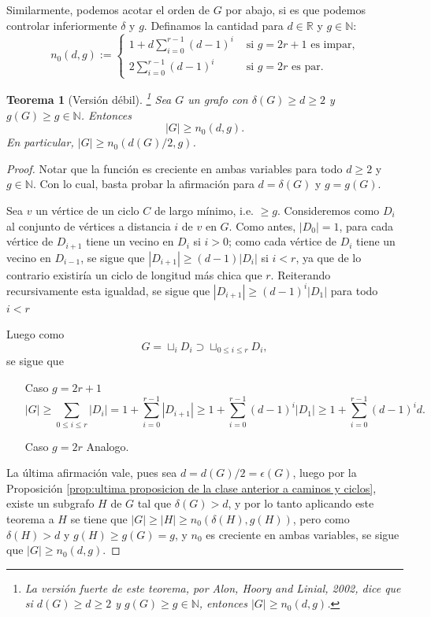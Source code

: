 \documentclass[12pt]{report}
\theoremstyle{plain}
\newtheorem{theorem}{Teorema}[section]
\theoremstyle{definition}
\newcommand{\naturals}{\mathbb{N}}
\newcommand{\reals}{\mathbb{R}}
\newcommand{\abs}[1]{\left \vert #1 \right \vert}
\begin{document}
Similarmente, podemos acotar el orden de $G$ por abajo, si es que podemos controlar inferiormente $\delta$ y $g$. Definamos la cantidad para $d \in \reals$ y $g \in \naturals$:
\[
n_0(d,g):= \begin{cases}
            1 + d \sum_{i = 0}^{r-1} (d-1)^i & \text{ si $g = 2 r +1$ es impar,}\\
            2 \sum_{i=0}^{r-1} (d-1)^i & \text{ si $g = 2 r$ es par.}
            \end{cases}
\]

\begin{theorem}[Versión débil]\label{th:version debil del teorema de Alon, Hoory y Lineal en 2002}\footnote{La versión fuerte de este teorema, por Alon, Hoory and Linial, 2002, dice que
si $d(G) \geq d \geq 2$ y $g(G) \geq g \in \naturals$, entonces $\abs G \geq n_0 (d,g)$.}
Sea $G$ un grafo con $\delta (G) \geq d \geq 2$ y $g(G) \geq g \in \naturals$. Entonces
\[
\abs G \geq n_0 (d,g).
\]
En particular, $\abs G \geq n_0 ( d(G)/2, g)$.
\end{theorem}
\begin{proof}
Notar que la función es creciente en ambas variables para todo $d \geq 2$ y $g \in \naturals$. Con lo cual, basta
probar la afirmación para $d = \delta(G)$ y $g = g(G)$.

Sea $v$ un vértice de un ciclo $C$ de largo mínimo, i.e. $\geq g$. Consideremos como $D_i$ al conjunto de vértices a distancia $i$ de $v$ en $G$. Como antes, $\abs {D_0} = 1$, para cada vértice de $D_{i+1}$ tiene un vecino en $D_{i}$ si $i>0$; como cada vértice de $D_i$ tiene un vecino en $D_{i-1}$, se sigue que $\abs{D_{i+1}}  \geq (d-1) \abs{D_i}$ si $i < r$, ya que de lo contrario existiría un ciclo de longitud más chica que $r$.
Reiterando recursivamente esta igualdad, se sigue que $\abs{D_{i+1}} \geq (d-1)^i \abs{D_1}$ para todo $i < r$

Luego como
$$
G = \sqcup_{i} D_i \supset \sqcup_{0\leq i\leq r} D_i,
$$
se sigue que
\begin{enumerate}
\item[Caso $g = 2 r +1$]
$$
\abs G \geq \sum_{0 \leq i \leq r} \abs{D_i} =  1 + \sum_{i=0}^{r-1} \abs{D_{i+1}} \geq 1 + \sum_{i=0}^{r-1} (d-1)^i \abs{D_1} \geq 1 + \sum_{i=0}^{r-1} (d-1)^i d.$$

\item[Caso $g = 2 r$] Analogo.
\end{enumerate}

La última afirmación vale, pues sea $d = d(G)/2 = \epsilon (G)$, luego por la Proposición \ref{prop:ultima proposicion de la clase anterior a caminos y ciclos}, existe un subgrafo $H$ de $G$ tal que $\delta (G) > d$, y por lo tanto aplicando este teorema a $H$ se tiene que $\abs G \geq \abs H \geq n_0 (\delta(H),g(H))$, pero como $\delta (H) > d$ y $g(H) \geq g(G) = g$, y $n_0$ es creciente en ambas variables, se sigue que $\abs G \geq n_0 (d,g)$.

\end{proof}
\end{document}
